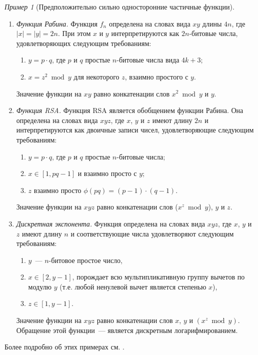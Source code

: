 \documentclass[12pt]{article}
\theoremstyle{definition}
\theoremstyle{plain}
\theoremstyle{remark}
\newtheorem{example}{Пример}[section]
\begin{document}
\begin{example}[Предположительно сильно односторонние частичные функции]
\mbox{}
\begin{enumerate}
\item \emph{Функция Рабина.} Функция $f_n$ определена на словах вида $xy$
длины $4n$, где $|x| = |y| = 2n$. При этом $x$ и $y$ интерпретируются как 
$2n$-битовые числа, удовлетворяющих следующим требованиям:
\begin{enumerate}
\item $y = p\cdot q$, где $p$ и $q$ простые $n$-битовые числа вида $4k+3$;
\item $x = z^2 \bmod y$ для некоторого $z$, взаимно простого с $y$.
\end{enumerate}
Значение функции на $xy$ равно конкатенации слов $x^2 \bmod y$ и $y$.

\item \emph{Функция RSA.} Функция RSA является обобщением функции Рабина.
Она определена на словах вида $xyz$, где $x$, $y$ и $z$ имеют длину $2n$
и интерпретируются как двоичные записи чисел, удовлетворяющие следующим
требованиям:
\begin{enumerate}
\item $y = p\cdot q$, где $p$ и $q$ простые $n$-битовые числа;
\item $x \in [1, pq - 1]$ и взаимно просто с $y$;
\item $z$ взаимно просто $\phi(pq) = (p-1)\cdot(q-1)$.
\end{enumerate}
Значение функции на $xyz$ равно конкатенации слов ($x^z \bmod y$), $y$ и $z$.
\item \emph{Дискретная экспонента.} Функция определена на словах вида $xyz$, где $x$, $y$ и $z$ имеют длину $n$ и соответствующие числа удовлетворяют следующим требованиям:
\begin{enumerate}
\item $y$~--- $n$-битовое простое число,
\item $x\in [2,y-1]$, порождает всю мультипликативную группу вычетов
по модулю $y$ (т.е. любой ненулевой вычет является степенью $x$),
\item $z\in [1,y-1]$.
\end{enumerate}
Значение функции на $xyz$ равно конкатенации слов $x$, $y$ и $(x^z\bmod y)$.
Обращение этой функции~--- является дискретным логарифмированием.
\end{enumerate}
Более подробно об этих примерах см. \cite{veresch17}.
\end{example}
\end{document}
